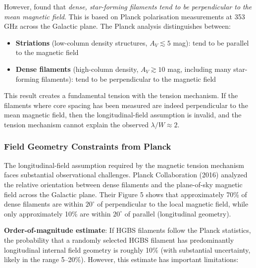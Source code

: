 \documentclass[11pt,a4paper]{article}
\begin{document}
However, \cite{Planck2016} found that \emph{dense, star-forming filaments tend to be perpendicular to the mean magnetic field}. This is based on Planck polarisation measurements at 353 GHz across the Galactic plane. The Planck analysis distinguishes between:
\begin{itemize}
    \item \textbf{Striations} (low-column density structures, $A_V \lesssim 5$ mag): tend to be parallel to the magnetic field
    \item \textbf{Dense filaments} (high-column density, $A_V \gtrsim 10$ mag, including many star-forming filaments): tend to be perpendicular to the magnetic field
\end{itemize}

This result creates a fundamental tension with the tension mechanism. If the filaments where core spacing has been measured are indeed perpendicular to the mean magnetic field, then the longitudinal-field assumption is invalid, and the tension mechanism cannot explain the observed $\lambda/W \approx 2$.

\subsubsection{Field Geometry Constraints from Planck}

The longitudinal-field assumption required by the magnetic tension mechanism faces substantial observational challenges. Planck Collaboration (2016) analyzed the relative orientation between dense filaments and the plane-of-sky magnetic field across the Galactic plane. Their Figure 5 shows that approximately 70\% of dense filaments are within $20^\circ$ of perpendicular to the local magnetic field, while only approximately 10\% are within $20^\circ$ of parallel (longitudinal geometry).

\textbf{Order-of-magnitude estimate}: If HGBS filaments follow the Planck statistics, the probability that a randomly selected HGBS filament has predominantly longitudinal internal field geometry is roughly 10\% (with substantial uncertainty, likely in the range 5--20\%). However, this estimate has important limitations:
\end{document}
